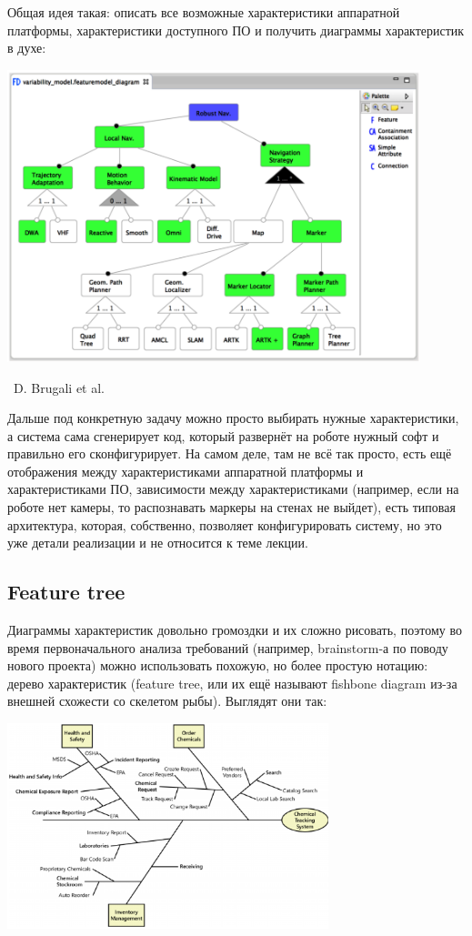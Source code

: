 \documentclass[a5paper]{article}
\newcommand{\attribution}[1] {
    \vspace{-4mm}\begin{flushright}\begin{scriptsize}%
    {\textcopyright\, #1}\end{scriptsize}\end{flushright}
}
\begin{document}
Общая идея такая: описать все возможные характеристики аппаратной платформы, характеристики доступного ПО и получить диаграммы характеристик в духе:

\begin{center}
    \includegraphics[width=0.9\textwidth]{featureDiagramExample.png}
    \attribution{D. Brugali et al.}
\end{center}

Дальше под конкретную задачу можно просто выбирать нужные характеристики, а система сама сгенерирует код, который развернёт на роботе нужный софт и правильно его сконфигурирует. На самом деле, там не всё так просто, есть ещё отображения между характеристиками аппаратной платформы и характеристиками ПО, зависимости между характеристиками (например, если на роботе нет камеры, то распознавать маркеры на стенах не выйдет), есть типовая архитектура, которая, собственно, позволяет конфигурировать систему, но это уже детали реализации и не относится к теме лекции.

\subsection{Feature tree}

Диаграммы характеристик довольно громоздки и их сложно рисовать, поэтому во время первоначального анализа требований (например, brainstorm-а по поводу нового проекта) можно использовать похожую, но более простую нотацию: дерево характеристик (feature tree, или их ещё называют fishbone diagram из-за внешней схожести со скелетом рыбы). Выглядят они так:

\begin{center}
    \includegraphics[width=0.7\textwidth]{featureTree.png}
\end{center}
\end{document}

